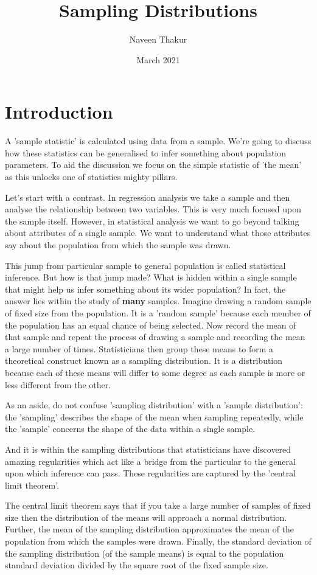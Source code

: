 \documentclass{article}
\title{Sampling Distributions}
\author{Naveen Thakur }
\date{March 2021}
\begin{document}
\maketitle

\section{Introduction}
A 'sample statistic' is calculated using data from a sample. We're going to discuss how these statistics can be generalised to infer something about population parameters. To aid the discussion we focus on the simple statistic of 'the mean' as this unlocks one of statistics mighty pillars.

Let's start with a contrast. In regression analysis we take a sample and then analyse the relationship between two variables. This is very much focused upon the sample itself. However, in statistical analysis we want to go beyond talking about attributes of a single sample. We want to understand what those attributes say about the population from which the sample was drawn.

This jump from particular sample to general population is called statistical inference. But how is that jump made? What is hidden within a single sample that might help us infer something about its wider population? In fact, the answer lies within the study of \textbf{many} samples. Imagine drawing a random sample of fixed size from the population. It is a 'random sample' because each member of the population has an equal chance of being selected. Now record the mean of that sample and repeat the process of drawing a sample and recording the mean a large number of times. Statisticians then group these means to form a theoretical construct known as a sampling distribution. It is a distribution because each of these means will differ to some degree as each sample is more or less different from the other.

As an aside, do not confuse 'sampling distribution' with a 'sample distribution': the 'sampling' describes the shape of the mean when sampling repeatedly, while the 'sample' concerns the shape of the data within a single sample.

And it is within the sampling distributions that statisticians have discovered amazing regularities which act like a bridge from the particular to the general upon which inference can pass. These regularities are captured by the 'central limit theorem'.

The central limit theorem says that if you take a large number of samples of fixed size then the distribution of the means will approach a normal distribution. Further, the mean of the sampling distribution approximates the mean of the population from which the samples were drawn. Finally, the standard deviation of the sampling distribution (of the sample means) is equal to the population standard deviation divided by the square root of the fixed sample size.
\end{document}
